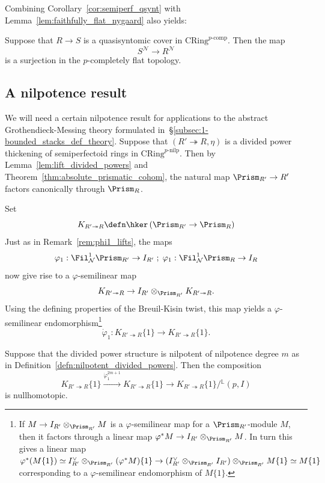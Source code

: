 \documentclass[10pt]{amsart}
\begin{document}
Combining Corollary~\ref{cor:semiperf_qsynt} with Lemma~\ref{lem:faithfully_flat_nygaard} also yields:
\begin{corollary}
\label{cor:quasisyntomic_descent_general}
Suppose that $R\to S$ is a quasisyntomic cover in $\mathrm{CRing}^{p\text{-comp}}$. Then the map
\[
S^{\mathcal{N}}\to R^{\mathcal{N}}
\]
is a surjection in the $p$-completely flat topology.
\end{corollary}



\subsection{A nilpotence result}
\label{subsec:nilpotence}

We will need a certain nilpotence result for applications to the abstract Grothendieck-Messing theory formulated in~\S\ref{subsec:1-bounded_stacks_def_theory}. Suppose that $(R'\twoheadrightarrow R,\eta)$ is a divided power thickening of semiperfectoid rings in $\mathrm{CRing}^{p\text{-nilp}}$. Then by Lemma~\ref{lem:lift_divided_powers} and Theorem~\ref{thm:absolute_prismatic_cohom}, the natural map $\Prism_{R'}\to R'$ factors canonically through $\Prism_R$. 


Set
\[
K_{R'\twoheadrightarrow R} \defn \hker\left(\Prism_{R'}\to \Prism_R\right)
\]
Just as in Remark~\ref{rem:phi1_lifts}, the maps
\[
\varphi_1: \Fil^1_{\mathcal{N}}\Prism_{R'}\to I_{R'}\;;\; \varphi_1:\Fil^1_{\mathcal{N}}\Prism_R\to I_R
\]
now give rise to a $\varphi$-semilinear map
\[
K_{R'\twoheadrightarrow R} \to I_{R'}\otimes_{\Prism_{R'}}K_{R'\twoheadrightarrow R}.
\]
Using the defining properties of the Breuil-Kisin twist, this map yields a $\varphi$-semilinear endomorphism\footnote{If $M\to I_{R'}\otimes_{\Prism_{R'}}M$ is a $\varphi$-semilinear map for a $\Prism_{R'}$-module $M$, then it factors through a linear map $\varphi^*M \to I_{R'}\otimes_{\Prism_{R'}}M$. In turn this gives a linear map $\varphi^*(M\{1\}) \simeq I_{R'}^\vee\otimes_{\Prism_{R'}}(\varphi^*M)\{1\}\to (I_{R'}^\vee\otimes_{\Prism_{R'}}I_{R'})\otimes_{\Prism_{R'}}M\{1\}\simeq M\{1\}$ corresponding to a $\varphi$-semilinear endomorphism of $M\{1\}$.}
\[
\dot{\varphi}_1: K_{R'\twoheadrightarrow R}\{1\}\to K_{R'\twoheadrightarrow R}\{1\}.
\]



\begin{proposition}
\label{prop:dot_varphi_1_nilpotent}
Suppose that the divided power structure is nilpotent of nilpotence degree $m$ as in Definition~\ref{defn:nilpotent_divided_powers}. Then the composition 
\[
K_{R'\twoheadrightarrow R}\{1\} \xrightarrow{\dot{\varphi}_1^{2m+1}} K_{R'\twoheadrightarrow R}\{1\}\to K_{R'\twoheadrightarrow R}\{1\}/{}^{\mathbb{L}}(p,I)
\]
is nullhomotopic.
\end{proposition}
\end{document}
